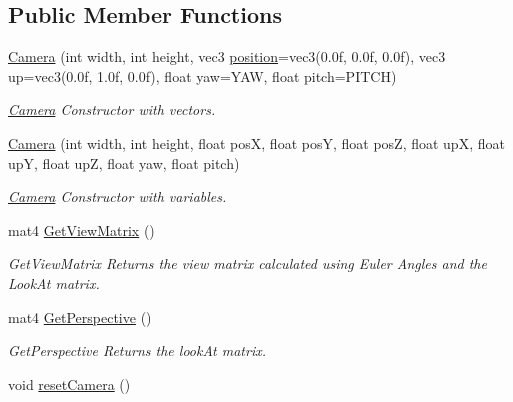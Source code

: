\subsection*{Public Member Functions}
\begin{DoxyCompactItemize}
\item 
\hyperlink{classCamera_ab7a973c909384f298849f8b8cc78f96a}{Camera} (int width, int height, vec3 \hyperlink{classCamera_a6bd96884fb5fb652b71042f2d7f0122c}{position}=vec3(0.\+0f, 0.\+0f, 0.\+0f), vec3 up=vec3(0.\+0f, 1.\+0f, 0.\+0f), float yaw=\+Y\+A\+W, float pitch=\+P\+I\+T\+C\+H)
\begin{DoxyCompactList}\small\item\em \hyperlink{classCamera}{Camera} Constructor with vectors. \end{DoxyCompactList}\item 
\mbox{\label{classCamera_a63f2b4fd5bbd47ed7634116425d63d94}} 
\hyperlink{classCamera_a63f2b4fd5bbd47ed7634116425d63d94}{Camera} (int width, int height, float posX, float posY, float posZ, float upX, float upY, float upZ, float yaw, float pitch)
\begin{DoxyCompactList}\small\item\em \hyperlink{classCamera}{Camera} Constructor with variables. \end{DoxyCompactList}\item 
\mbox{\label{classCamera_aff6521263c6ecba92fa98a8e9e4461bf}} 
mat4 \hyperlink{classCamera_aff6521263c6ecba92fa98a8e9e4461bf}{Get\+View\+Matrix} ()
\begin{DoxyCompactList}\small\item\em Get\+View\+Matrix Returns the view matrix calculated using Euler Angles and the Look\+At matrix. \end{DoxyCompactList}\item 
\mbox{\label{classCamera_a9c08d56907d6122c9214f30194657252}} 
mat4 \hyperlink{classCamera_a9c08d56907d6122c9214f30194657252}{Get\+Perspective} ()
\begin{DoxyCompactList}\small\item\em Get\+Perspective Returns the look\+At matrix. \end{DoxyCompactList}\item 
\mbox{\label{classCamera_aee8027b5309a5dc77db956d27924c387}} 
void \hyperlink{classCamera_aee8027b5309a5dc77db956d27924c387}{reset\+Camera} ()

\end{DoxyCompactItemize}
